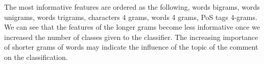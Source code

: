 \documentclass[10pt,a5paper,twoside]{article}
\begin{document}
\begin{figure}
\centering
{}
\end{figure}

The most informative features are ordered as the following, words bigrams, words
unigrams, words trigrams, characters 4 grams, words 4 grams, PoS tags 4-grams.
We can see that the features of the longer grams become less informative once we
increased the number of classes given to the classifier. The increasing
importance of shorter grams of words may indicate the influence of the topic of the comment on the classification.
\end{document}
